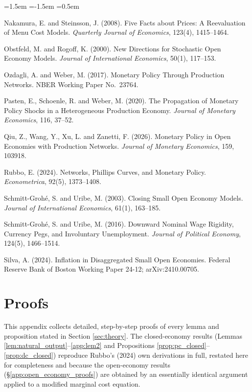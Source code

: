 \documentclass[12pt]{article}
\begin{document}
\begin{list}{}{\leftmargin=1.5em \itemindent=-1.5em \itemsep=0.5em}
\item Nakamura, E. and Steinsson, J. (2008). Five Facts about Prices: A Reevaluation of Menu Cost
Models. \textit{Quarterly Journal of Economics}, 123(4), 1415--1464.

\item Obstfeld, M. and Rogoff, K. (2000). New Directions for Stochastic Open Economy Models.
\textit{Journal of International Economics}, 50(1), 117--153.

\item Ozdagli, A. and Weber, M. (2017). Monetary Policy Through Production Networks. NBER Working
Paper No.\ 23764.

\item Pasten, E., Schoenle, R. and Weber, M. (2020). The Propagation of Monetary Policy Shocks in a
Heterogeneous Production Economy. \textit{Journal of Monetary Economics}, 116, 37--52.

\item Qiu, Z., Wang, Y., Xu, L. and Zanetti, F. (2026). Monetary Policy in Open Economies with
Production Networks. \textit{Journal of Monetary Economics}, 159, 103918.

\item Rubbo, E. (2024). Networks, Phillips Curves, and Monetary Policy. \textit{Econometrica}, 92(5),
1373--1408.

\item Schmitt-Grohé, S. and Uribe, M. (2003). Closing Small Open Economy Models. \textit{Journal of
International Economics}, 61(1), 163--185.

\item Schmitt-Grohé, S. and Uribe, M. (2016). Downward Nominal Wage Rigidity, Currency Pegs, and
Involuntary Unemployment. \textit{Journal of Political Economy}, 124(5), 1466--1514.

\item Silva, A. (2024). Inflation in Disaggregated Small Open Economies. Federal Reserve Bank of
Boston Working Paper 24-12; arXiv:2410.00705.

\end{list}

\newpage
\appendix
\section{Proofs}
\label{app:proofs}

This appendix collects detailed, step-by-step proofs of every lemma and proposition stated in Section
\ref{sec:theory}. The closed-economy results (Lemmas \ref{lem:natural_output}--\ref{app:lem2} and
Propositions \ref{prop:pc_closed}--\ref{prop:dc_closed}) reproduce Rubbo's (2024) own derivations in
full, restated here for completeness and because the open-economy results
(\S\ref{app:open_economy_proofs}) are obtained by an essentially identical argument applied to a
modified marginal cost equation.
\end{document}
